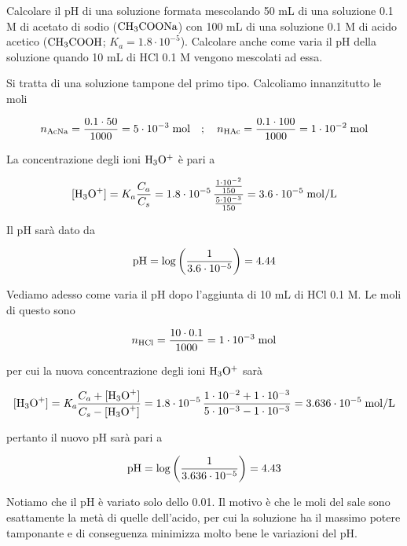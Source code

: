 \newpage

\begin{esercizio}
    Calcolare il pH di una soluzione formata mescolando 50 mL di una soluzione 0.1 M di acetato di sodio ($\rm CH_3COONa$) con 100 mL di una soluzione 0.1 M di acido acetico ($\rm CH_3COOH$; $K_a=1.8 \cdot 10^{-5}$). Calcolare anche come varia il pH della soluzione quando 10 mL di HCl 0.1 M vengono mescolati ad essa.
\end{esercizio}
\begin{soluzione}
    Si tratta di una soluzione tampone del primo tipo. Calcoliamo innanzitutto le moli

$$n_{\rm AcNa}=\frac{0.1 \cdot 50}{1000}= 5 \cdot 10^{-3} \; \text{mol}
\quad;\quad
n_{\rm HAc}=\frac{0.1 \cdot 100}{1000}=1 \cdot 10^{-2} \; \rm mol$$

La concentrazione degli ioni $\rm H_3O^+$ è pari a

$$[\text{H}_3\text{O}^+]=K_a\frac{C_a}{C_s}
=1.8 \cdot 10^{-5}\,\frac{\frac{1 \cdot 10^{-2}}{150}}{\frac{5 \cdot 10^{-3}}{150}}=3.6 \cdot 10^{-5} \; \rm mol/L$$

Il pH sarà dato da

$$\rm pH=\log{\left(\frac{1}{3.6 \cdot 10^{-5}}\right)}=4.44$$

Vediamo adesso come varia il pH dopo l'aggiunta di 10 mL di HCl 0.1 M. Le moli di questo sono

$$n_{\rm HCl}=\frac{10 \cdot 0.1}{1000}=1 \cdot 10^{-3} \; \rm mol$$

per cui la nuova concentrazione degli ioni $\rm H_3O^+$ sarà

$${[\text{H}_3\text{O}^+]}=\textit{K}_\textit{a} \frac{C_a + \rm{[\text{H}_3\text{O}^+]}}{C_s - \rm{[\text{H}_3\text{O}^+]}}
=1.8 \cdot 10^{-5} \, \frac{1 \cdot 10^{-2} + 1 \cdot 10^{-3}}{5 \cdot 10^{-3} - 1 \cdot 10^{-3}}
=3.636 \cdot 10^{-5} \; \rm mol/L$$

pertanto il nuovo pH sarà pari a

$$\rm pH=\log{\left(\frac{1}{3.636 \cdot 10^{-5}}\right)}=4.43$$

Notiamo che il pH è variato solo dello 0.01. Il motivo è che le moli del sale sono esattamente la metà di quelle dell'acido, per cui la soluzione ha il massimo potere tamponante e di conseguenza minimizza molto bene le variazioni del pH.
\end{soluzione}

\newpage

